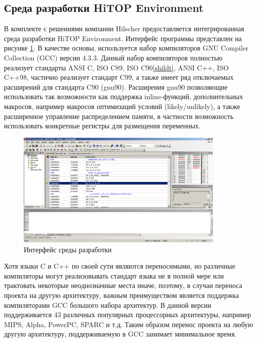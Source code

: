 \documentclass[a4paper,14pt,bachelor]{disser}
\begin{document}
\subsection{Среда разработки HiTOP Environment}
В комплекте с решениями компании Hilscher предоставляется интегрированная среда разработки HiTOP Environment. Интерфейс программы представлен на рисунке \ref{hitop}. В качестве основы, используется набор компиляторов GNU Compiler Collection (GCC) версии 4.3.3. Данный набор компиляторов полностью реализует стандарты ANSI C, ISO C89, ISO C90\ref{shildt}, ANSI C++, ISO C++98, частично реализует стандарт C99, а также имеет ряд отключаемых расширений для стандарта C90 (gnu90). Расширения gnu90 позволяющие использовать так возможности как поддержка inline-функций, дополнительных макросов, например макросов оптимизаций условий (likely/unlikely)\cite{Griffits}, а также расширенное управление распределением памяти, в частности возможность использовать конкретные регистры для размещения переменных.

\begin{figure}[h!] %
\addtocounter{myfigs}{1}
 \begin{center}
 \includegraphics[width=0.9\textwidth]{hitop}
 \caption{\label{hitop} Интерфейс среды разработки}
 \end{center}
\end{figure}

Хотя языки C и C++ по своей сути являются переносимыми, но различные компиляторы могут реализовывать стандарт языка не в полной мере или трактовать некоторые неоднозначные места иначе, поэтому, в случаи переноса проекта на другую архитектуру, важным преимуществом является поддержка компиляторами GCC большого набора архитектур. В данной версии поддерживается 43 различных популярных процессорных архитектуры, например MIPS, Alpha, PowerPC, SPARC и т.д. Таким образом перенос проекта на любую другую архитектуру, поддерживаемую в GCC занимает минимальное время.
\end{document}
